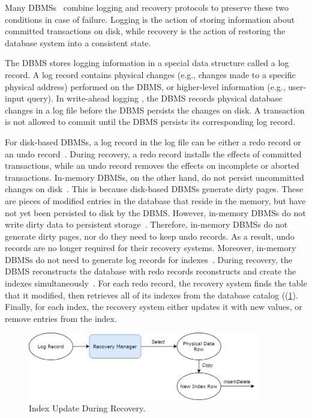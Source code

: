 \documentclass[12pt]{cmuthesis}
\begin{document}
Many DBMSs~\cite{noisepage, malviya14, hekaton2013, silo_r, azure, postgres, mysql} combine logging and recovery protocols to preserve these two conditions in case of failure. Logging is the action of storing information about committed transactions on disk, while recovery is the action of restoring the database system into a consistent state.

The DBMS stores logging information in a special data structure called a log record. A log record contains physical changes (e.g., changes made to a specific physical address) performed on the DBMS, or higher-level information (e.g., user-input query). In write-ahead logging \cite{aries}, the DBMS records physical database changes in a log file before the DBMS persists the changes on disk. A transaction is not allowed to commit until the DBMS persists its corresponding log record.

For disk-based DBMSs, a log record in the log file can be either a redo record or an undo record~\cite{aries}. During recovery, a redo record installs the effects of committed transactions, while an undo record removes the effects on incomplete or aborted transactions. In-memory DBMSs, on the other hand, do not persist uncommitted changes on disk~\cite{noisepage, malviya14, hekaton2013, scuba14, silo_r}. This is because disk-based DBMSs generate dirty pages. These are pieces of modified entries in the database that reside in the memory, but have not yet been persisted to disk by the DBMS. However, in-memory DBMSs do not write dirty data to persistent storage~\cite{noisepage, malviya14, hekaton2013, scuba14, silo_r}. Therefore, in-memory DBMSs do not generate dirty pages, nor do they need to keep undo records. As a result, undo records are no longer required for their recovery systems. Moreover, in-memory DBMSs do not need to generate log records for indexes~\cite{faeber17}. During recovery, the DBMS reconstructs the database with redo records reconstructs and create the indexes simultaneously~\cite{malviya14, hekaton2013}. For each redo record, the recovery system finds the table that it modified, then retrieves all of its indexes from the database catalog ((\cref{fig:recovery_index_update}). Finally, for each index, the recovery system either updates it with new values, or remove entries from the index. 

\begin{figure}[t!]
\centering
\centering
\includegraphics[width=0.9\textwidth]{images/RecoverIndex.png}
\caption{Index Update During Recovery.}
 \label{fig:recovery_index_update}
\end{figure}
\end{document}
